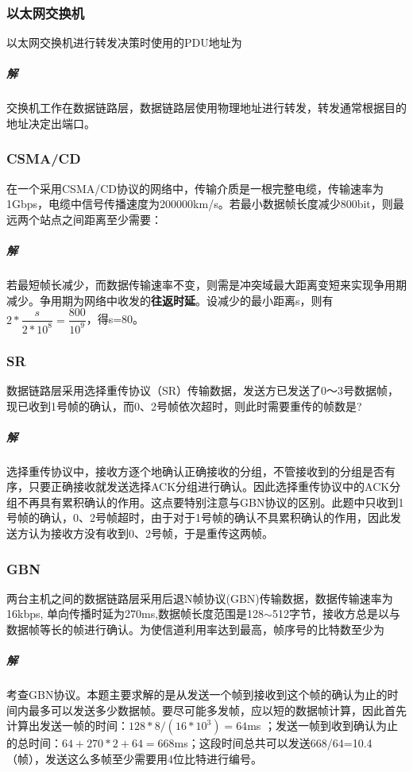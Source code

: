 \subsubsection{以太网交换机}
以太网交换机进行转发决策时使用的PDU地址为

\subparagraph{解}
交换机工作在数据链路层，数据链路层使用物理地址进行转发，转发通常根据目的地址决定出端口。


\subsubsection{CSMA/CD}
在一个采用CSMA/CD协议的网络中，传输介质是一根完整电缆，传输速率为1Gbps，电缆中信号传播速度为200000km/s。若最小数据帧长度减少800bit，则最远两个站点之间距离至少需要：

\subparagraph{解}
若最短帧长减少，而数据传输速率不变，则需是冲突域最大距离变短来实现争用期减少。争用期为网络中收发的\textbf{往返时延}。设减少的最小距离s，则有\(2 * \dfrac{s}{2 * 10^8} = \dfrac{800}{10^9}\)，得s=80。


\subsubsection{SR}
数据链路层采用选择重传协议（SR）传输数据，发送方已发送了0～3号数据帧，现已收到1号帧的确认，而0、2号帧依次超时，则此时需要重传的帧数是?

\subparagraph{解}
选择重传协议中，接收方逐个地确认正确接收的分组，不管接收到的分组是否有序，只要正确接收就发送选择ACK分组进行确认。因此选择重传协议中的ACK分组不再具有累积确认的作用。这点要特别注意与GBN协议的区别。此题中只收到1号帧的确认，0、2号帧超时，由于对于1号帧的确认不具累积确认的作用，因此发送方认为接收方没有收到0、2号帧，于是重传这两帧。


\subsubsection{GBN}
两台主机之间的数据链路层采用后退N帧协议(GBN)传输数据，数据传输速率为
16kbps, 单向传播时延为270ms,数据帧长度范围是128\(\sim\)512字节，接收方总是以与数据帧等长的帧进行确认。为使信道利用率达到最高，帧序号的比特数至少为

\subparagraph{解}
考查GBN协议。本题主要求解的是从发送一个帧到接收到这个帧的确认为止的时间内最多可以发送多少数据帧。要尽可能多发帧，应以短的数据帧计算，因此首先计算出发送一帧的时间：\(128 * 8/(16 * 10^3)=64\)ms ；发送一帧到收到确认为止的总时间：\(64+270*2+64=668\)ms；这段时间总共可以发送668/64=10.4（帧），发送这么多帧至少需要用4位比特进行编号。



